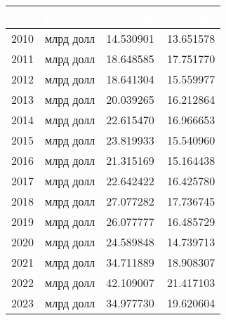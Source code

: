 \begin{tabularx}{\textwidth}{|X|X|r|r|}
    \hline
    \rowcolor{black} \textcolor{white}{\textbf{Год}} & \textcolor{white}{\textbf{Ед. Изм.}} & \textcolor{white}{\textbf{Китай}} & \textcolor{white}{\textbf{Германия}} \\ \hline
    2010 & млрд долл & 14.530901 & 13.651578 \\ \hline
    2011 & млрд долл & 18.648585 & 17.751770 \\ \hline
    2012 & млрд долл & 18.641304 & 15.559977 \\ \hline
    2013 & млрд долл & 20.039265 & 16.212864 \\ \hline
    2014 & млрд долл & 22.615470 & 16.966653 \\ \hline
    2015 & млрд долл & 23.819933 & 15.540960 \\ \hline
    2016 & млрд долл & 21.315169 & 15.164438 \\ \hline
    2017 & млрд долл & 22.642422 & 16.425780 \\ \hline
    2018 & млрд долл & 27.077282 & 17.736745 \\ \hline
    2019 & млрд долл & 26.077777 & 16.485729 \\ \hline
    2020 & млрд долл & 24.589848 & 14.739713 \\ \hline
    2021 & млрд долл & 34.711889 & 18.908307 \\ \hline
    2022 & млрд долл & 42.109007 & 21.417103 \\ \hline
    2023 & млрд долл & 34.977730 & 19.620604 \\ \hline
\end{tabularx}